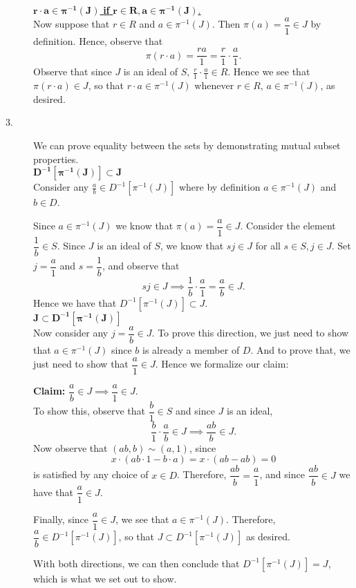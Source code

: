 \documentclass[12pt,letterpaper]{algebra_book}
\theoremstyle{definition}
\begin{document}
\begin{prf}
\begin{description}
        \noindent\underline{$\bm{r\cdot a \in \pi^{-1}(J)}$ \textbf{if}
        $\bm{r \in R, a \in \pi^{-1}(J)}$.}\\[1.2ex]
        Now suppose that $r \in R$ and $a \in \pi^{-1}(J)$. Then $\pi(a) =
        \dfrac{a}{1} \in J$ by definition. Hence, observe that 
        \[
            \pi(r \cdot a) = \dfrac{ra}{1} = \frac{r}{1} \cdot \frac{a}{1}.
        \]
        Observe that since $J$ is an ideal of $S$, $\frac{r}{1} \cdot \frac{a}{1}
        \in R$. Hence we see that $\pi(r \cdot a) \in J$, so that $r \cdot
        a \in \pi^{-1}(J)$ whenever $r \in R$, $a \in \pi^{-1}(J)$, as
        desired. 
    
        \item[3.] We can prove equality between the sets by demonstrating
        mutual subset properties. \\
        \noindent\underline{$\bm{D^{-1}[\pi^{-1}(J)] \subset J}$}\\[1.2ex]
        Consider any $\frac{a}{b} \in D^{-1}[\pi^{-1}(J)]$ where by definition $a \in
        \pi^{-1}(J)$ and $b \in D$. 
    
        Since $a \in \pi^{-1}(J)$ we know that $\pi(a) = \dfrac{a}{1} \in
        J$. Consider the element $\dfrac{1}{b} \in S$. Since $J$ is an
        ideal of $S$, we know that $sj \in J$ for all $s \in S, j \in J$.
        Set $j = \dfrac{a}{1}$ and $s = \dfrac{1}{b}$, and observe that 
        \[
            sj \in J \implies \frac{1}{b} \cdot \frac{a}{1} = \frac{a}{b} \in J.
        \]
        Hence we have that $D^{-1}[\pi^{-1}(J)] \subset J$. 
        \\
        \noindent\underline{$\bm{J \subset D^{-1}[\pi^{-1}(J)]}$}\\[1.2ex]
        Now consider any $j = \dfrac{a}{b} \in J$. To prove this direction,
        we just need to show that $a \in \pi^{-1}(J)$ since $b$ is already
        a member of $D$. And to prove that, we just need to show that
        $\dfrac{a}{1} \in J$. Hence we formalize our claim:
    
        \textbf{Claim:} $\dfrac{a}{b} \in J \implies \dfrac{a}{1} \in J$.\\
        To show this, observe that $\dfrac{b}{1} \in S$ and since $J$ is an
        ideal, 
        \[
            \frac{b}{1} \cdot \frac{a}{b} \in J \implies \frac{ab}{b} \in J.
        \]
        Now observe that $(ab, b) \sim (a, 1)$, since 
        \[
            x \cdot (ab\cdot 1 -b\cdot a) = x \cdot (ab - ab) = 0
        \]
        is satisfied by any choice of $x \in D$. Therefore, $\dfrac{ab}{b}
        = \dfrac{a}{1}$, and since $\dfrac{ab}{b} \in J$ we have that
        $\dfrac{a}{1} \in J$. 
    
        Finally, since $\dfrac{a}{1} \in J$, we see that $a \in
        \pi^{-1}(J)$. Therefore, $\dfrac{a}{b} \in D^{-1}[\pi^{-1}(J)]$, so
        that $J \subset D^{-1}[\pi^{-1}(J)]$ as desired. 
    
        With both directions, we can then conclude that
        $D^{-1}[\pi^{-1}(J)] = J$, which is what we set out to show.
        \end{description}
    \end{prf}
\end{document}
